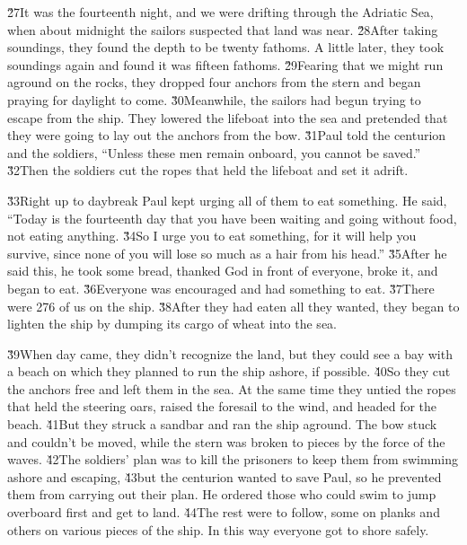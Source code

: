 \v{27}It was the fourteenth night, and we were drifting through the Adriatic Sea, when about midnight the sailors suspected that land was near. \v{28}After taking soundings, they found the depth to be twenty fathoms. A little later, they took soundings again and found it was fifteen fathoms. \v{29}Fearing that we might run aground on the rocks, they dropped four anchors from the stern and began praying for daylight to come. \v{30}Meanwhile, the sailors had begun trying to escape from the ship. They lowered the lifeboat into the sea and pretended that they were going to lay out the anchors from the bow. \v{31}Paul told the centurion and the soldiers, ``Unless these men remain onboard, you cannot be saved.'' \v{32}Then the soldiers cut the ropes that held the lifeboat and set it adrift.

\v{33}Right up to daybreak Paul kept urging all of them to eat something. He said, ``Today is the fourteenth day that you have been waiting and going without food, not eating anything. \v{34}So I urge you to eat something, for it will help you survive, since none of you will lose so much as a hair from his head.'' \v{35}After he said this, he took some bread, thanked God in front of everyone, broke it, and began to eat. \v{36}Everyone was encouraged and had something to eat. \v{37}There were 276 of us on the ship. \v{38}After they had eaten all they wanted, they began to lighten the ship by dumping its cargo of wheat into the sea.

\v{39}When day came, they didn't recognize the land, but they could see a bay with a beach on which they planned to run the ship ashore, if possible. \v{40}So they cut the anchors free and left them in the sea. At the same time they untied the ropes that held the steering oars, raised the foresail to the wind, and headed for the beach. \v{41}But they struck a sandbar and ran the ship aground. The bow stuck and couldn't be moved, while the stern was broken to pieces by the force of the waves. \v{42}The soldiers' plan was to kill the prisoners to keep them from swimming ashore and escaping, \v{43}but the centurion wanted to save Paul, so he prevented them from carrying out their plan. He ordered those who could swim to jump overboard first and get to land. \v{44}The rest were to follow, some on planks and others on various pieces of the ship. In this way everyone got to shore safely.

